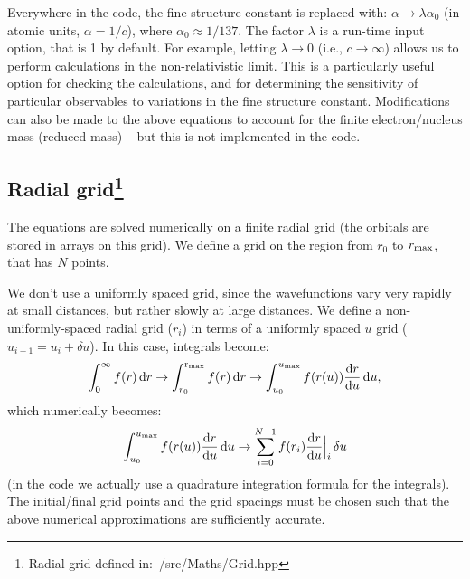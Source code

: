 \documentclass[10pt,twocolumn,a4paper]{article}%
\newcommand{\be}{\begin{equation}}
\newcommand{\ee}{\end{equation}}
\def\d{\ensuremath{{\rm d}}}
\begin{document}
Everywhere in the code, the fine structure constant is replaced with: $\alpha\to\lambda \alpha_0$ (in atomic units, $\alpha=1/c$), where $\alpha_0\approx1/137$.
The factor $\lambda$ is a run-time input option, that is 1 by default. %
For example, letting $\lambda\to0$ (i.e., $c\to\infty$) allows us to perform calculations in the non-relativistic limit.
This is a particularly useful option for checking the calculations, and for determining the sensitivity of particular observables to variations in the fine structure constant.
Modifications can also be made to the above equations to account for the finite electron/nucleus mass (reduced mass) -- but this is not implemented in the code.





\subsection[Radial grid]{Radial grid\label{sec:grid}\footnote{Radial grid defined in:~/src/Maths/Grid.hpp}}

The equations are solved numerically on a finite radial grid (the orbitals are stored in arrays on this grid).
We define a grid on the region from $r_0$ to $r_{\rm max}$, that has $N$ points.

We don't use a uniformly spaced grid, since the wavefunctions vary very rapidly at small distances, but rather slowly at large distances.
We define a non-uniformly-spaced radial grid ($r_i$) in terms of a uniformly spaced $u$ grid ($u_{i+1}=u_i+\delta u$).
In this case, integrals become:
\be
\int_{0}^{\infty} f(r)\,\d r \to
\int_{r_0}^{\rm r_{max}} f(r)\,\d r \to
\int_{u_0}^{u_{\rm max}} f(r(u))\frac{\d r}{\d u}\,\d u,
\ee
which numerically becomes:
\be
\int_{u_0}^{u_{\rm max}} f(r(u))\frac{\d r}{\d u}\,\d u \to
\sum_{i=0}^{N-1} f(r_i)\frac{\d r}{\d u}\Big|_i\,\delta u
\ee
(in the code we actually use a quadrature integration formula for the integrals).
The initial/final grid points and the grid spacings must be chosen such that the above numerical approximations are sufficiently accurate.
\end{document}
